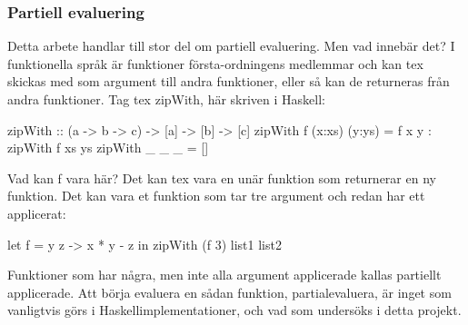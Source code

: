 \documentclass[Rapport]{subfiles}
\begin{document}
\subsubsection{Partiell evaluering}
Detta arbete handlar till stor del om partiell evaluering. Men vad innebär det?
I funktionella språk är funktioner första-ordningens medlemmar och kan tex
skickas med som argument till andra funktioner, eller så kan de returneras från
andra funktioner. Tag tex zipWith, här skriven i Haskell:
\begin{codeEx}
zipWith :: (a -> b -> c) -> [a] -> [b] -> [c]
zipWith f (x:xs) (y:ys) = f x y : zipWith f xs ys
zipWith _ _      _      = []
\end{codeEx}
Vad kan f vara här? Det kan tex vara en unär funktion som returnerar en ny
funktion. Det kan vara et funktion som tar tre argument och redan har ett
applicerat:
\begin{codeEx}
let f = \x y z -> x * y - z
in  zipWith (f 3) list1 list2
\end{codeEx}
Funktioner som har några, men inte alla argument applicerade kallas 
partiellt applicerade. Att börja evaluera en sådan funktion, partialevaluera,
är inget som vanligtvis görs i Haskellimplementationer, 
och vad som undersöks i detta projekt. 
\end{document}
